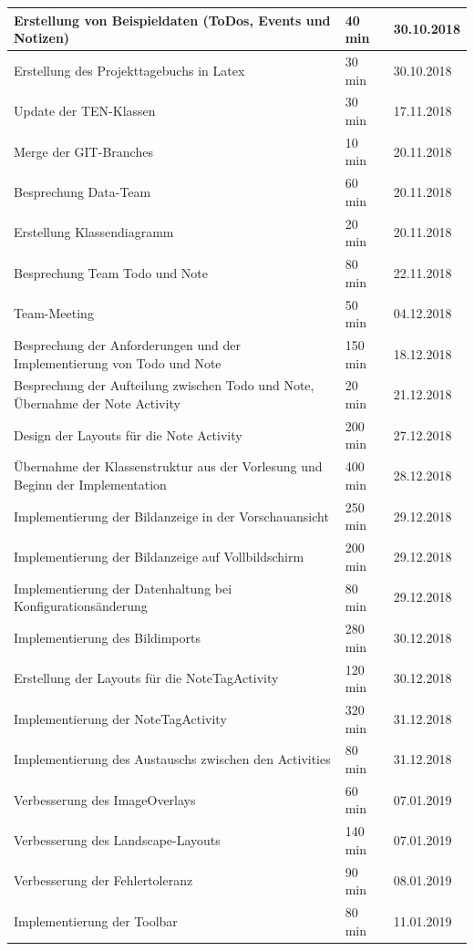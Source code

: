 \begin{longtable}{|p{10cm}|p{2cm}|p{2cm}|}
Erstellung von Beispieldaten (ToDos, Events und Notizen) & 40 min & 30.10.2018 \\ \hline
Erstellung des Projekttagebuchs in Latex & 30 min & 30.10.2018 \\ \hline
Update der TEN-Klassen & 30 min & 17.11.2018 \\ \hline
Merge der GIT-Branches & 10 min & 20.11.2018 \\ \hline
Besprechung Data-Team& 60 min & 20.11.2018 \\ \hline
Erstellung Klassendiagramm& 20 min & 20.11.2018 \\ \hline
Besprechung Team Todo und Note& 80 min & 22.11.2018 \\ \hline
Team-Meeting& 50 min & 04.12.2018 \\ \hline
Besprechung der Anforderungen und der Implementierung von Todo und Note& 150 min & 18.12.2018 \\ \hline
Besprechung der Aufteilung zwischen Todo und Note, Übernahme der Note Activity& 20 min & 21.12.2018 \\ \hline
Design der Layouts für die Note Activity& 200 min & 27.12.2018 \\ \hline
Übernahme der Klassenstruktur aus der Vorlesung und Beginn der Implementation& 400 min & 28.12.2018 \\ \hline
Implementierung der Bildanzeige in der Vorschauansicht& 250 min & 29.12.2018 \\ \hline
Implementierung der Bildanzeige auf Vollbildschirm& 200 min & 29.12.2018 \\ \hline
Implementierung der Datenhaltung bei Konfigurationsänderung & 80 min & 29.12.2018 \\ \hline
Implementierung des Bildimports & 280 min & 30.12.2018 \\ \hline
Erstellung der Layouts für die NoteTagActivity& 120 min & 30.12.2018 \\ \hline
Implementierung der NoteTagActivity & 320 min & 31.12.2018 \\ \hline
Implementierung des Austauschs zwischen den Activities& 80 min & 31.12.2018 \\ \hline
Verbesserung des ImageOverlays& 60 min & 07.01.2019 \\ \hline
Verbesserung des Landscape-Layouts& 140 min & 07.01.2019 \\ \hline
Verbesserung der Fehlertoleranz& 90 min & 08.01.2019 \\ \hline 
Implementierung der Toolbar& 80 min & 11.01.2019 \\ \hline 

\end{longtable}
